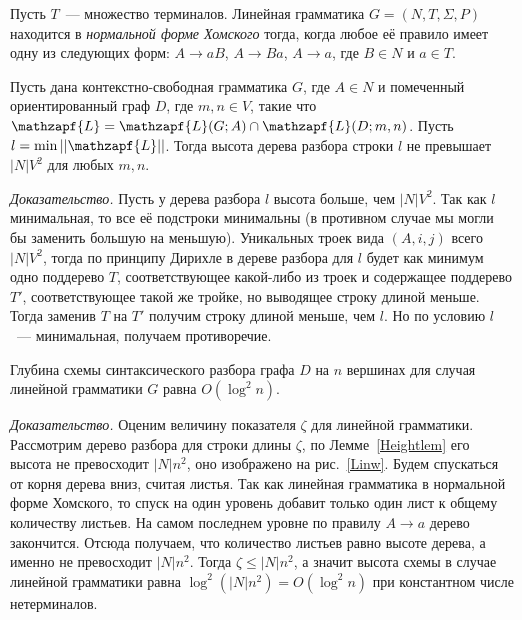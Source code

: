 Пусть $T$~--- множество терминалов. Линейная грамматика $G = (N, T, \Sigma, P)$ находится в \textit{нормальной форме Хомского} тогда, когда любое её правило имеет одну из следующих форм: $A \rightarrow aB$, $A \rightarrow Ba$, $A \rightarrow a$, где $B \in N$ и $a \in T$.
\begin{lemmarus}
\label{Heightlem} Пусть дана контекстно-свободная грамматика $G$, где $A \in N$ и помеченный ориентированный граф $D$, где $m, n \in V$, такие что $\mathzapf{L} = \mathzapf{L}(G; A) \cap \mathzapf{L}(D; m, n)$. Пусть $l = \min ||\mathzapf{L}||$. Тогда высота дерева разбора строки $l$ не превышает $|N|V^2$ для любых $m, n$.
\end{lemmarus}
\textit{Доказательство.} Пусть у дерева разбора $l$ высота больше, чем $|N|V^2$. Так как $l$ минимальная, то все её подстроки минимальны (в противном случае мы могли бы заменить большую на меньшую). Уникальных троек вида $(A, i, j)$ всего $|N|V^2$, тогда по принципу Дирихле в дереве разбора для $l$ будет как минимум одно поддерево $T$, соответствующее какой-либо из троек и содержащее поддерево $T'$, соответствующее такой же тройке, но выводящее строку длиной меньше. Тогда заменив $T$ на $T'$ получим строку длиной меньше, чем $l$. Но по условию $l$~--- минимальная, получаем противоречие.
\begin{theoremrus}
Глубина схемы синтаксического разбора графа $D$ на $n$ вершинах для случая линейной грамматики $G$ равна $O(\log^2 n)$.
\end{theoremrus}

\textit{Доказательство.} Оценим величину показателя $\zeta$ для линейной грамматики. Рассмотрим дерево разбора для строки длины $\zeta$, по Лемме~\ref{Heightlem} его высота не превосходит $|N|n^2$, оно изображено на рис.~\ref{Linw}. Будем спускаться от корня дерева вниз, считая листья. Так как линейная грамматика в нормальной форме Хомского, то спуск на один уровень добавит только один лист к общему количеству листьев. На самом последнем уровне по правилу $A \rightarrow a$ дерево закончится. Отсюда получаем, что количество листьев равно высоте дерева, а именно не превосходит $|N|n^2$. Тогда $\zeta \le |N|n^2$, а значит высота схемы в случае линейной грамматики равна $\log^2(|N|n^2) = O(\log^2 n)$ при константном числе нетерминалов.
